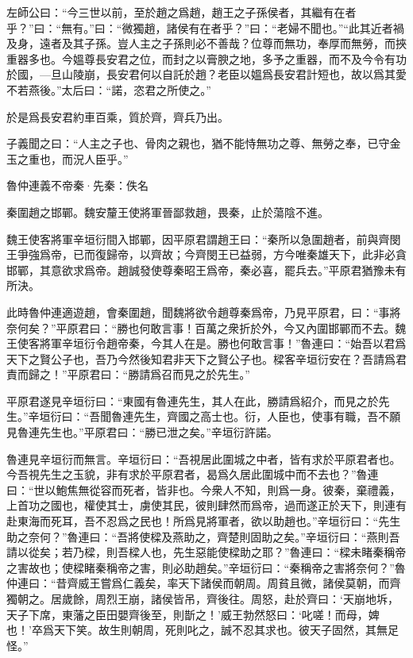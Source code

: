 \documentclass[12pt,a4paper]{ctexbook}
\begin{document}
左師公曰：“今三世以前，至於趙之爲趙，趙王之子孫侯者，其繼有在者乎？”曰：“無有。”曰：“微獨趙，諸侯有在者乎？”曰：“老婦不聞也。”“此其近者禍及身，遠者及其子孫。豈人主之子孫則必不善哉？位尊而無功，奉厚而無勞，而挾重器多也。今媼尊長安君之位，而封之以膏腴之地，多予之重器，而不及今令有功於國，—旦山陵崩，長安君何以自託於趙？老臣以媼爲長安君計短也，故以爲其愛不若燕後。”太后曰：“諾，恣君之所使之。”\par
於是爲長安君約車百乘，質於齊，齊兵乃出。\par
子義聞之曰：“人主之子也、骨肉之親也，猶不能恃無功之尊、無勞之奉，已守金玉之重也，而況人臣乎。”\par
魯仲連義不帝秦·先秦：佚名 \par
秦圍趙之邯鄲。魏安釐王使將軍晉鄙救趙，畏秦，止於蕩陰不進。\par
魏王使客將軍辛垣衍間入邯鄲，因平原君謂趙王曰：“秦所以急圍趙者，前與齊閔王爭強爲帝，已而復歸帝，以齊故；今齊閔王已益弱，方今唯秦雄天下，此非必貪邯鄲，其意欲求爲帝。趙誠發使尊秦昭王爲帝，秦必喜，罷兵去。”平原君猶豫未有所決。\par
此時魯仲連適遊趙，會秦圍趙，聞魏將欲令趙尊秦爲帝，乃見平原君，曰：“事將奈何矣？”平原君曰：“勝也何敢言事！百萬之衆折於外，今又內圍邯鄲而不去。魏王使客將軍辛垣衍令趙帝秦，今其人在是。勝也何敢言事！”魯連曰：“始吾以君爲天下之賢公子也，吾乃今然後知君非天下之賢公子也。樑客辛垣衍安在？吾請爲君責而歸之！”平原君曰：“勝請爲召而見之於先生。”\par
平原君遂見辛垣衍曰：“東國有魯連先生，其人在此，勝請爲紹介，而見之於先生。”辛垣衍曰：“吾聞魯連先生，齊國之高士也。衍，人臣也，使事有職，吾不願見魯連先生也。”平原君曰：“勝已泄之矣。”辛垣衍許諾。\par
魯連見辛垣衍而無言。辛垣衍曰：“吾視居此圍城之中者，皆有求於平原君者也。今吾視先生之玉貌，非有求於平原君者，曷爲久居此圍城中而不去也？”魯連曰：“世以鮑焦無從容而死者，皆非也。今衆人不知，則爲一身。彼秦，棄禮義，上首功之國也，權使其士，虜使其民，彼則肆然而爲帝，過而遂正於天下，則連有赴東海而死耳，吾不忍爲之民也！所爲見將軍者，欲以助趙也。”辛垣衍曰：“先生助之奈何？”魯連曰：“吾將使樑及燕助之，齊楚則固助之矣。”辛垣衍曰：“燕則吾請以從矣；若乃樑，則吾樑人也，先生惡能使樑助之耶？”魯連曰：“樑未睹秦稱帝之害故也；使樑睹秦稱帝之害，則必助趙矣。”辛垣衍曰：“秦稱帝之害將奈何？”魯仲連曰：“昔齊威王嘗爲仁義矣，率天下諸侯而朝周。周貧且微，諸侯莫朝，而齊獨朝之。居歲餘，周烈王崩，諸侯皆吊，齊後往。周怒，赴於齊曰：‘天崩地坼，天子下席，東藩之臣田嬰齊後至，則斮之！’威王勃然怒曰：‘叱嗟！而母，婢也！’卒爲天下笑。故生則朝周，死則叱之，誠不忍其求也。彼天子固然，其無足怪。”\par
\end{document}
